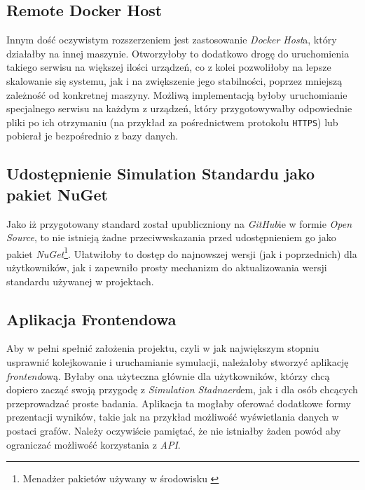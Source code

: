 \subsection{Remote Docker Host}

\par Innym dość oczywistym rozszerzeniem jest zastosowanie \emph{Docker Host}a, który działałby na innej maszynie. Otworzyłoby to dodatkowo drogę do uruchomienia takiego serwisu na większej ilości urządzeń, co z kolei pozwoliłoby na lepsze skalowanie się systemu, jak i na zwiększenie jego stabilności, poprzez mniejszą zależność od konkretnej maszyny. Możliwą implementacją byłoby uruchomianie specjalnego serwisu na każdym z urządzeń, który przygotowywałby odpowiednie pliki po ich otrzymaniu (na przykład za pośrednictwem protokołu \texttt{HTTPS}) lub pobierał je bezpośrednio z bazy danych.

\subsection{Udostępnienie Simulation Standardu jako pakiet NuGet}

\par Jako iż przygotowany standard został upubliczniony na \emph{GitHub}ie w formie \emph{Open Source}, to nie istnieją żadne przeciwwskazania przed udostępnieniem go jako pakiet \emph{NuGet}\footnote{Menadżer pakietów używany w środowisku \emph{\dotnet{}}}. Ułatwiłoby to dostęp do najnowszej wersji (jak i poprzednich) dla użytkowników, jak i zapewniło prosty mechanizm do aktualizowania wersji standardu używanej w projektach.

\subsection{Aplikacja Frontendowa}

\par Aby w pełni spełnić założenia projektu, czyli w jak największym stopniu usprawnić kolejkowanie i uruchamianie symulacji, należałoby stworzyć aplikację \emph{frontend}ową. Byłaby ona użyteczna głównie dla użytkowników, którzy chcą dopiero zacząć swoją przygodę z \emph{Simulation Stadnaerd}em, jak i dla osób chcących przeprowadzać proste badania. Aplikacja ta mogłaby oferować dodatkowe formy prezentacji wyników, takie jak na przykład możliwość wyświetlania danych w postaci grafów. Należy oczywiście pamiętać, że nie istniałby żaden powód aby ograniczać możliwość korzystania z \emph{API}.

